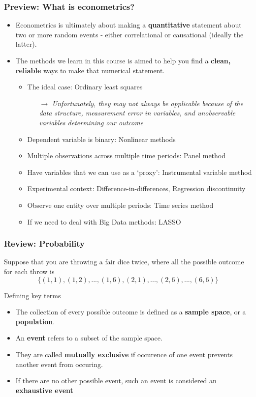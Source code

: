 \documentclass[aspectratio=169]{beamer}
\newenvironment{wideitemize}{\itemize\addtolength{\itemsep}{10pt}}{\enditemize}
\begin{document}
\begin{frame}
\frametitle{Preview: What is econometrics?}
\begin{itemize}
\item Econometrics is ultimately about making a \textbf{quantitative} statement about two or more random events - either correlational or causational (ideally the latter). 
\item The methods we learn in this course is aimed to help you find a \textbf{clean, reliable} ways to make that numerical statement.  
\begin{itemize}
\item The ideal case: Ordinary least squares
\begin{itemize}
\item[$\to$]  \textit{Unfortunately, they may not always be applicable because of the data structure, measurement error in variables, and unobservable variables determining our outcome}
\end{itemize}
\item Dependent variable is binary: Nonlinear methods
\item Multiple observations across multiple time periods: Panel method
\item Have variables that we can use as a `proxy': Instrumental variable method
\item Experimental context: Difference-in-differences, Regression discontinuity
\item Observe one entity over multiple periods: Time series method
\item If we need to deal with Big Data methods: LASSO
\end{itemize}
  
\end{itemize}
\end{frame}

\begin{frame}
\frametitle{Review: Probability}
\begin{wideitemize}
\item  Suppose that you are throwing a fair dice twice, where all the possible outcome for each throw is
\[
\{(1,1),(1,2),...,(1,6),(2,1),...,(2,6),...,(6,6)\}
\]
\item Defining key terms
\begin{itemize}
\item The collection of every possible outcome is defined as a \textbf{sample space}, or a \textbf{population}.
\item An \textbf{event} refers to a subset of the sample space. 
\item  They are called \textbf{mutually exclusive} if occurence of one event prevents another event from occuring.
\item If there are no other possible event, such an event is considered an \textbf{exhaustive event}
\end{itemize}
\end{wideitemize}
\end{frame}
\end{document}
